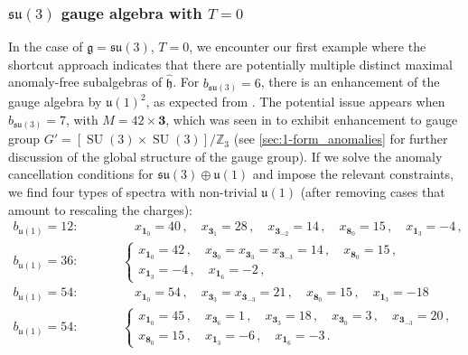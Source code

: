 \documentclass[11pt, a4paper]{article}
\newcommand*{\bbZ}{\ensuremath{\mathbb{Z}}}
\newcommand*{\fkg}{\ensuremath{\mathfrak{g}}}
\newcommand*{\fkh}{\ensuremath{\mathfrak{h}}}
\DeclareMathOperator{\SU}{SU}
\newcommand*{\fku}{\ensuremath{\mathfrak{u}}}
\newcommand*{\fksu}{\ensuremath{\mathfrak{su}}}
\begin{document}
\subsubsection{\texorpdfstring{$\fksu(3)$}{su(3)} gauge algebra with \texorpdfstring{$T = 0$}{T=0}}
\label{sec:su3_example}

In the case of $\fkg = \fksu(3)$, $T = 0$, we encounter our first example where the shortcut approach indicates that there are potentially multiple distinct maximal anomaly-free subalgebras of $\hat{\fkh}$. For $b_{\fksu(3)} = 6$, there is an enhancement of the gauge algebra by $\fku(1)^2$, as expected from \cite{Raghuram:2020vxm}. The potential issue appears when $b_{\fksu(3)} = 7$, with $M=42 \times {\bm{3}}$, which was seen in \cite{Raghuram:2020vxm} to exhibit enhancement to gauge group $G' = [\SU(3) \times \SU(3)] / \bbZ_3$ (see \cref{sec:1-form_anomalies} for further discussion of the global structure of the gauge group). If we solve the anomaly cancellation conditions for $\fksu(3) \oplus \fku(1)$ and impose the relevant constraints, we find four types of spectra with non-trivial $\fku(1)$ (after removing cases that amount to rescaling the charges):
    \begin{equation}
        \label{eq:su3threespectra}
        \begin{alignedat}{2}
            b_{\fku(1)} = 12\colon &&& \qquad x_{\bm{1}_0} = 40\,, \quad x_{\bm{3}_1} = 28\,, \quad x_{\bm{3}_{-2}} = 14\,, \quad x_{\bm{8}_0} = 15\,, \quad x_{\bm{1}_3} = -4\,,  \\
            b_{\fku(1)} = 36\colon &&& \quad
            \left\{\begin{gathered}
                 x_{\bm{1}_0} = 42\,, \quad x_{\bm{3}_0} = x_{\bm{3}_3} = x_{\bm{3}_{-3}} = 14\,, \quad x_{\bm{8}_0} = 15\,, \\
                 x_{\bm{1}_3} = -4\,, \quad x_{\bm{1}_6} = -2\,,
            \end{gathered}\right. \\
            b_{\fku(1)} = 54\colon &&& \qquad x_{\bm{1}_0} = 54\,, \quad x_{\bm{3}_3} = x_{\bm{3}_{-3}} = 21\,, \quad x_{\bm{8}_0} = 15\,, \quad x_{\bm{1}_3} = -18\\
            b_{\fku(1)} = 54\colon &&& \quad
            \left\{\begin{gathered}
                x_{\bm{1}_0} = 45\,, \quad x_{\bm{3}_6} = 1\,, \quad x_{\bm{3}_3} = 18\,, \quad x_{\bm{3}_0} = 3\,, \quad x_{\bm{3}_{-3}} = 20\,, \\
                x_{\bm{8}_0} = 15\,, \quad x_{\bm{1}_3} = -6\,, \quad x_{\bm{1}_6} = -3\,.
            \end{gathered}\right.
        \end{alignedat}
    \end{equation}
\end{document}
